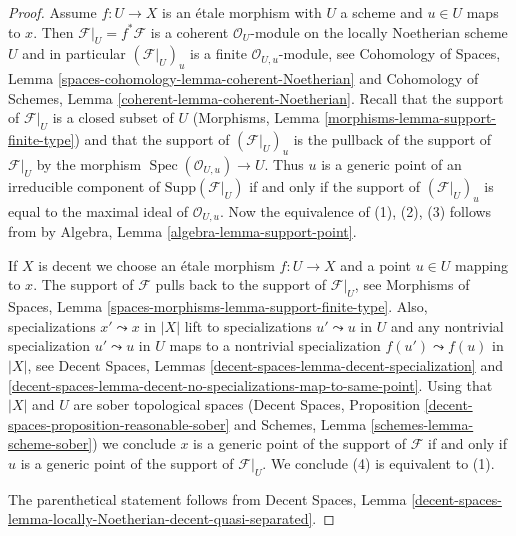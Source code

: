 \documentclass[10pt,a4paper]{amsart}
\theoremstyle{plain}
\theoremstyle{definition}
\theoremstyle{remark}
\numberwithin{equation}{subsection}
\def\Spec{\mathop{\mathrm{Spec}}}
\begin{document}
\begin{proof}
Assume $f : U \to X$ is an \'etale morphism with $U$ a scheme
and $u \in U$ maps to $x$. Then $\mathcal{F}|_U = f^*\mathcal{F}$
is a coherent $\mathcal{O}_U$-module on the locally Noetherian
scheme $U$ and in particular $(\mathcal{F}|_U)_u$ is a finite
$\mathcal{O}_{U, u}$-module, see Cohomology of Spaces, Lemma
\ref{spaces-cohomology-lemma-coherent-Noetherian}
and Cohomology of Schemes, Lemma
\ref{coherent-lemma-coherent-Noetherian}.
Recall that the support of $\mathcal{F}|_U$ is a closed subset of $U$
(Morphisms, Lemma \ref{morphisms-lemma-support-finite-type}) and
that the support of $(\mathcal{F}|_U)_u$ is the pullback
of the support of $\mathcal{F}|_U$ by the morphism
$\Spec(\mathcal{O}_{U, u}) \to U$. Thus $u$ is a generic point
of an irreducible component of $\text{Supp}(\mathcal{F}|_U)$
if and only if the support of $(\mathcal{F}|_U)_u$ is equal
to the maximal ideal of $\mathcal{O}_{U, u}$.
Now the equivalence of (1), (2), (3) follows from
by Algebra, Lemma \ref{algebra-lemma-support-point}.

\medskip\noindent
If $X$ is decent we choose an \'etale morphism $f : U \to X$ and a point
$u \in U$ mapping to $x$. The support of $\mathcal{F}$ pulls back to
the support of $\mathcal{F}|_U$, see
Morphisms of Spaces, Lemma \ref{spaces-morphisms-lemma-support-finite-type}.
Also, specializations $x' \leadsto x$ in $|X|$ lift to specializations
$u' \leadsto u$ in $U$ and any nontrivial specialization $u' \leadsto u$ in $U$
maps to a nontrivial specialization $f(u') \leadsto f(u)$ in $|X|$, see
Decent Spaces, Lemmas
\ref{decent-spaces-lemma-decent-specialization} and
\ref{decent-spaces-lemma-decent-no-specializations-map-to-same-point}.
Using that $|X|$ and $U$ are sober topological spaces
(Decent Spaces, Proposition \ref{decent-spaces-proposition-reasonable-sober}
and
Schemes, Lemma \ref{schemes-lemma-scheme-sober}) we conclude
$x$ is a generic point of the support of $\mathcal{F}$
if and only if $u$ is a generic point of the support of
$\mathcal{F}|_U$. We conclude (4) is equivalent to (1).

\medskip\noindent
The parenthetical statement follows from Decent Spaces, Lemma
\ref{decent-spaces-lemma-locally-Noetherian-decent-quasi-separated}.
\end{proof}
\end{document}
